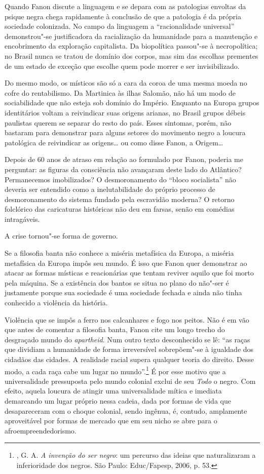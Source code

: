 Quando Fanon discute a linguagem e se depara com as patologias envoltas
da psique negra chega rapidamente à conclusão de que a patologia é da
própria sociedade colonizada. No campo da linguagem a ``racionalidade
universal'' demonstrou"-se justificadora da racialização da humanidade
para a manutenção e encobrimento da exploração capitalista. Da
biopolítica passou"-se à necropolítica; no Brasil nunca se tratou de
domínio dos corpos, mas sim das escolhas prementes de um estado de
exceção que escolhe quem pode morrer e ser invisibilizado.

Do mesmo modo, os místicos são só a cara da coroa de uma mesma moeda no
cofre do rentabilismo. Da Martinica às ilhas Salomão, não há um modo de
sociabilidade que não esteja sob domínio do Império. Enquanto na Europa
grupos identitários voltam a reivindicar suas origens arianas, no Brasil
grupos débeis paulistas querem se separar do resto do país. Esses
sintomas, porém, não bastaram para demonstrar para alguns setores do
movimento negro a loucura patológica de reivindicar as origens\ldots{} ou
como disse Fanon, a Origem\ldots{}

Depois de 60 anos de atraso em
relação ao formulado por Fanon, poderia me perguntar: as figuras da
consciência não avançaram deste
lado do Atlântico? Permanecemos imobilizados? O desmoronamento do
``bloco socialista'' não deveria ser entendido como a inelutabilidade do
próprio processo de desmoronamento do sistema fundado pela escravidão
moderna? O retorno folclórico das caricaturas históricas não deu em
farsas, senão em comédias intragáveis.

A crise tornou"-se forma de governo.

Se a filosofia banta não conhece a miséria metafísica da Europa, a
miséria metafísica da Europa impôs seu mundo. É isso que Fanon quer
demonstrar ao atacar as formas místicas e reacionárias que tentam
reviver aquilo que foi morto pela máquina. Se a existência dos bantos se
situa no plano do não"-ser é justamente porque sua sociedade é uma
sociedade fechada e ainda não tinha conhecido a violência da história.

Violência que se impôs a ferro nos calcanhares e fogo nos peitos. Não é
em vão que antes de comentar a filosofia banta, Fanon cite um longo
trecho do desgraçado mundo do \emph{apartheid}. Num outro texto
desconhecido se lê: ``as raças que dividiam a humanidade de forma
irreversível sobrepõem"-se à igualdade dos cidadãos das cidades. A
realidade racial supera qualquer teoria do direito. Desse modo, a cada
raça cabe um lugar no mundo''.\footnote{,
  G. A. \emph{A invenção do ser negro}: um percurso das ideias que
  naturalizaram a inferioridade dos negros. São Paulo: Educ/Fapesp,
  2006, p. 53.} É por esse motivo que a universalidade pressuposta pelo
mundo colonial exclui de seu \emph{Todo} o negro. Com efeito, aquela
loucura de atingir uma universalidade mítica e imediata demarcando um
lugar próprio nessa cadeia, dada por formas de vida que desapareceram
com o choque colonial, sendo ingênua, é, contudo, amplamente
aproveitável por formas de mercado que em seu nicho se abre para o
afroempreendedorismo.

